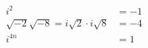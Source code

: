 \documentclass[preview]{standalone}
\begin{document}
\begin{align*}
i^2 &= -1 \\ \sqrt{-2}\sqrt{-8} = i\sqrt{2} \cdot i\sqrt{8} &= -4 \\ i^{4n} &= 1
\end{align*}
\end{document}
